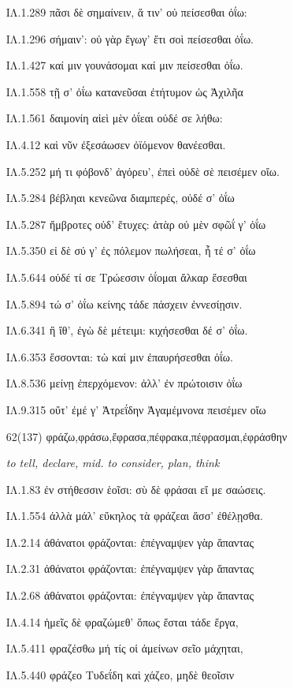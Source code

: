\begin{enumerate}
{ΙΛ.1.289 πᾶσι δὲ σημαίνειν, ἅ τιν' οὐ πείσεσθαι ὀΐω: 

ΙΛ.1.296 σήμαιν': οὐ γὰρ ἔγωγ' ἔτι σοὶ πείσεσθαι ὀΐω. 

ΙΛ.1.427 καί μιν γουνάσομαι καί μιν πείσεσθαι ὀΐω. 

ΙΛ.1.558 τῇ σ' ὀΐω κατανεῦσαι ἐτήτυμον ὡς Ἀχιλῆα 

ΙΛ.1.561 δαιμονίη αἰεὶ μὲν ὀΐεαι οὐδέ σε λήθω: 

ΙΛ.4.12 καὶ νῦν ἐξεσάωσεν ὀϊόμενον θανέεσθαι. 

ΙΛ.5.252 μή τι φόβονδ' ἀγόρευ', ἐπεὶ οὐδὲ σὲ πεισέμεν οἴω. 

ΙΛ.5.284 βέβληαι κενεῶνα διαμπερές, οὐδέ σ' ὀΐω 

ΙΛ.5.287 ἤμβροτες οὐδ' ἔτυχες: ἀτὰρ οὐ μὲν σφῶΐ γ' ὀΐω 

ΙΛ.5.350 εἰ δὲ σύ γ' ἐς πόλεμον πωλήσεαι, ἦ τέ σ' ὀΐω 

ΙΛ.5.644 οὐδέ τί σε Τρώεσσιν ὀΐομαι ἄλκαρ ἔσεσθαι 

ΙΛ.5.894 τώ σ' ὀΐω κείνης τάδε πάσχειν ἐννεσίῃσιν. 

ΙΛ.6.341 ἢ ἴθ', ἐγὼ δὲ μέτειμι: κιχήσεσθαι δέ σ' ὀΐω. 

ΙΛ.6.353 ἔσσονται: τὼ καί μιν ἐπαυρήσεσθαι ὀΐω. 

ΙΛ.8.536 μείνῃ ἐπερχόμενον: ἀλλ' ἐν πρώτοισιν ὀΐω 

ΙΛ.9.315 οὔτ' ἐμέ γ' Ἀτρεΐδην Ἀγαμέμνονα πεισέμεν οἴω 

}

\clearpage
\item[\large 62(137)]{\large \g φράζω,φράσω,ἔφρασα,πέφρακα,πέφρασμαι,ἐφράσθην	}

\hspace{0.2cm} \textit{  to tell, declare, mid. to consider, plan, think}

{\g
ΙΛ.1.83 ἐν στήθεσσιν ἑοῖσι: σὺ δὲ φράσαι εἴ με σαώσεις. 

ΙΛ.1.554 ἀλλὰ μάλ' εὔκηλος τὰ φράζεαι ἅσσ' ἐθέλῃσθα. 

ΙΛ.2.14 ἀθάνατοι φράζονται: ἐπέγναμψεν γὰρ ἅπαντας 

ΙΛ.2.31 ἀθάνατοι φράζονται: ἐπέγναμψεν γὰρ ἅπαντας 

ΙΛ.2.68 ἀθάνατοι φράζονται: ἐπέγναμψεν γὰρ ἅπαντας 

ΙΛ.4.14 ἡμεῖς δὲ φραζώμεθ' ὅπως ἔσται τάδε ἔργα, 

ΙΛ.5.411 φραζέσθω μή τίς οἱ ἀμείνων σεῖο μάχηται, 

ΙΛ.5.440 φράζεο Τυδεΐδη καὶ χάζεο, μηδὲ θεοῖσιν 

}
\end{enumerate}
